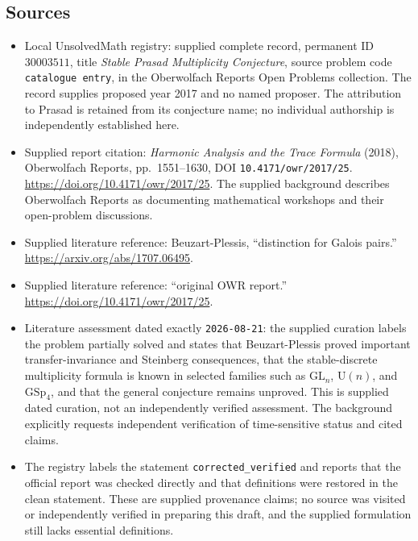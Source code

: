 \documentclass[11pt]{article}
\begin{document}
\subsection{Sources}
\begin{itemize}
\item Local UnsolvedMath registry: supplied complete record, permanent ID \(30003511\), title \emph{Stable Prasad Multiplicity Conjecture}, source problem code \texttt{catalogue entry}, in the Oberwolfach Reports Open Problems collection. The record supplies proposed year 2017 and no named proposer. The attribution to Prasad is retained from its conjecture name; no individual authorship is independently established here.
\item Supplied report citation: \emph{Harmonic Analysis and the Trace Formula} (2018), Oberwolfach Reports, pp.\ 1551--1630, DOI \texttt{10.4171/owr/2017/25}. \url{https://doi.org/10.4171/owr/2017/25}. The supplied background describes Oberwolfach Reports as documenting mathematical workshops and their open-problem discussions.
\item Supplied literature reference: Beuzart-Plessis, ``distinction for Galois pairs.'' \url{https://arxiv.org/abs/1707.06495}.
\item Supplied literature reference: ``original OWR report.'' \url{https://doi.org/10.4171/owr/2017/25}.
\item Literature assessment dated exactly \texttt{2026-08-21}: the supplied curation labels the problem partially solved and states that Beuzart-Plessis proved important transfer-invariance and Steinberg consequences, that the stable-discrete multiplicity formula is known in selected families such as \(\mathrm{GL}_n\), \(\mathrm{U}(n)\), and \(\mathrm{GSp}_4\), and that the general conjecture remains unproved. This is supplied dated curation, not an independently verified assessment. The background explicitly requests independent verification of time-sensitive status and cited claims.
\item The registry labels the statement \texttt{corrected\_verified} and reports that the official report was checked directly and that definitions were restored in the clean statement. These are supplied provenance claims; no source was visited or independently verified in preparing this draft, and the supplied formulation still lacks essential definitions.
\end{itemize}
\end{document}
